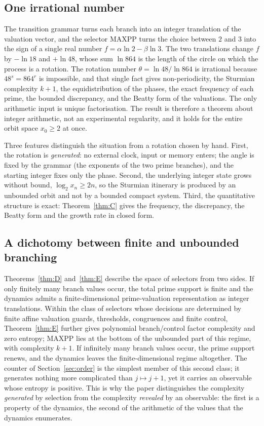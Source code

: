 \subsection{One irrational number}
The transition grammar turns each branch into an integer translation of the valuation vector, and the selector \textsf{MAXPP} turns the choice between $2$ and $3$ into the sign of a single real number $f=\alpha\ln2-\beta\ln3$. The two translations change $f$ by $-\ln18$ and $+\ln48$, whose sum $\ln864$ is the length of the circle on which the process is a rotation. The rotation number $\theta=\ln48/\ln864$ is irrational because $48^s=864^r$ is impossible, and that single fact gives non-periodicity, the Sturmian complexity $k+1$, the equidistribution of the phases, the exact frequency of each prime, the bounded discrepancy, and the Beatty form of the valuations. The only arithmetic input is unique factorisation. The result is therefore a theorem about integer arithmetic, not an experimental regularity, and it holds for the entire orbit space $x_0\ge2$ at once.

Three features distinguish the situation from a rotation chosen by hand. First, the rotation is \emph{generated}: no external clock, input or memory enters; the angle is fixed by the grammar (the exponents of the two prime branches), and the starting integer fixes only the phase. Second, the underlying integer state grows without bound, $\log_2x_n\ge2n$, so the Sturmian itinerary is produced by an unbounded orbit and not by a bounded compact system. Third, the quantitative structure is exact: Theorem~\ref{thm:C} gives the frequency, the discrepancy, the Beatty form and the growth rate in closed form.

\subsection{A dichotomy between finite and unbounded branching}
Theorems~\ref{thm:D} and~\ref{thm:E} describe the space of selectors from two sides. If only finitely many branch values occur, the total prime support is finite and the dynamics admits a finite-dimensional prime-valuation representation as integer translations. Within the class of selectors whose decisions are determined by finite affine valuation guards, thresholds, congruences and finite control, Theorem~\ref{thm:E} further gives polynomial branch/control factor complexity and zero entropy; \textsf{MAXPP} lies at the bottom of the unbounded part of this regime, with complexity $k+1$. If infinitely many branch values occur, the prime support renews, and the dynamics leaves the finite-dimensional regime altogether. The counter of Section~\ref{sec:order} is the simplest member of this second class; it generates nothing more complicated than $j\mapsto j+1$, yet it carries an observable whose entropy is positive. This is why the paper distinguishes the complexity \emph{generated} by selection from the complexity \emph{revealed} by an observable: the first is a property of the dynamics, the second of the arithmetic of the values that the dynamics enumerates.

